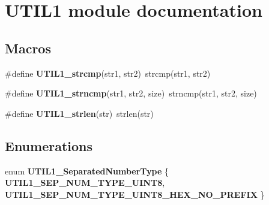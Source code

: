 \hypertarget{group___u_t_i_l1__module}{\section{U\-T\-I\-L1 module documentation}
\label{group___u_t_i_l1__module}
}
\subsection*{Macros}
\begin{DoxyCompactItemize}
\item 
\hypertarget{group___u_t_i_l1__module_gacc44a9f4c3b926c9b5993f5265a1cbd5}{\#define {\bfseries U\-T\-I\-L1\-\_\-strcmp}(str1, str2)~strcmp(str1, str2)}\label{group___u_t_i_l1__module_gacc44a9f4c3b926c9b5993f5265a1cbd5}

\item 
\hypertarget{group___u_t_i_l1__module_gaa3275fde4ebb265b5756d98c4b9be5c2}{\#define {\bfseries U\-T\-I\-L1\-\_\-strncmp}(str1, str2, size)~strncmp(str1, str2, size)}\label{group___u_t_i_l1__module_gaa3275fde4ebb265b5756d98c4b9be5c2}

\item 
\hypertarget{group___u_t_i_l1__module_ga16599fecc43cb5f4c66f1dd6060f6f0c}{\#define {\bfseries U\-T\-I\-L1\-\_\-strlen}(str)~strlen(str)}\label{group___u_t_i_l1__module_ga16599fecc43cb5f4c66f1dd6060f6f0c}

\end{DoxyCompactItemize}
\subsection*{Enumerations}
\begin{DoxyCompactItemize}
\item 
enum {\bfseries U\-T\-I\-L1\-\_\-\-Separated\-Number\-Type} \{ {\bfseries U\-T\-I\-L1\-\_\-\-S\-E\-P\-\_\-\-N\-U\-M\-\_\-\-T\-Y\-P\-E\-\_\-\-U\-I\-N\-T8}, 
{\bfseries U\-T\-I\-L1\-\_\-\-S\-E\-P\-\_\-\-N\-U\-M\-\_\-\-T\-Y\-P\-E\-\_\-\-U\-I\-N\-T8\-\_\-\-H\-E\-X\-\_\-\-N\-O\-\_\-\-P\-R\-E\-F\-I\-X}
 \}
\end{DoxyCompactItemize}
